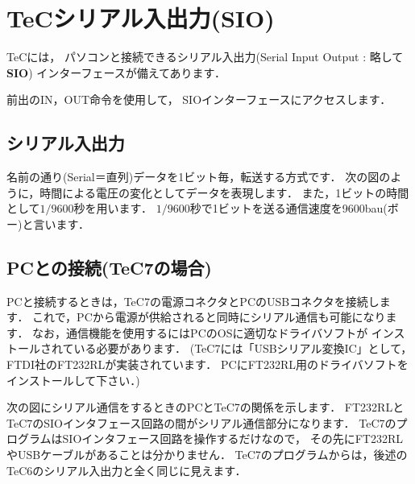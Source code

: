 \newpage
\section{TeCシリアル入出力(SIO)}
\label{sio}
TeCには，
パソコンと接続できるシリアル入出力(Serial Input Output : 略して {\bf SIO})
インターフェースが備えてあります．

前出のIN，OUT命令を使用して，
SIOインターフェースにアクセスします．

\subsection{シリアル入出力}
名前の通り(Serial＝直列)データを1ビット毎，転送する方式です．
次の図のように，時間による電圧の変化としてデータを表現します．
また，1ビットの時間として$1/9600$秒を用います．
$1/9600$秒で1ビットを送る通信速度を9600bau(ボー)と言います．

\begin{center}
\epsfxsize=7.5cm
\end{center}

\subsection{PCとの接続(TeC7の場合)}
PCと接続するときは，TeC7の電源コネクタとPCのUSBコネクタを接続します．
これで，PCから電源が供給されると同時にシリアル通信も可能になります．
なお，通信機能を使用するにはPCのOSに適切なドライバソフトが
インストールされている必要があります．
(TeC7には「USBシリアル変換IC」として，
FTDI社のFT232RLが実装されています．
PCにFT232RL用のドライバソフトをインストールして下さい．)

次の図にシリアル通信をするときのPCとTeC7の関係を示します．
FT232RLとTeC7のSIOインタフェース回路の間がシリアル通信部分になります．
TeC7のプログラムはSIOインタフェース回路を操作するだけなので，
その先にFT232RLやUSBケーブルがあることは分かりません．
TeC7のプログラムからは，後述のTeC6のシリアル入出力と全く同じに見えます．

\begin{center}
\epsfxsize=7.5cm
\end{center}

